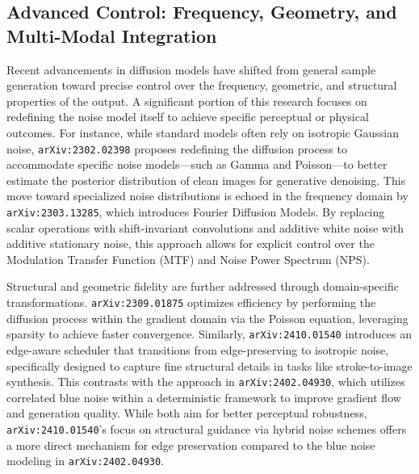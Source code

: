 \documentclass[11pt]{article}
\begin{document}
\subsection{Advanced Control: Frequency, Geometry, and Multi-Modal Integration}

Recent advancements in diffusion models have shifted from general sample generation toward precise control over the frequency, geometric, and structural properties of the output. A significant portion of this research focuses on redefining the noise model itself to achieve specific perceptual or physical outcomes. For instance, while standard models often rely on isotropic Gaussian noise, \texttt{arXiv:2302.02398} proposes redefining the diffusion process to accommodate specific noise models—such as Gamma and Poisson—to better estimate the posterior distribution of clean images for generative denoising. This move toward specialized noise distributions is echoed in the frequency domain by \texttt{arXiv:2303.13285}, which introduces Fourier Diffusion Models. By replacing scalar operations with shift-invariant convolutions and additive white noise with additive stationary noise, this approach allows for explicit control over the Modulation Transfer Function (MTF) and Noise Power Spectrum (NPS).

Structural and geometric fidelity are further addressed through domain-specific transformations. \texttt{arXiv:2309.01875} optimizes efficiency by performing the diffusion process within the gradient domain via the Poisson equation, leveraging sparsity to achieve faster convergence. Similarly, \texttt{arXiv:2410.01540} introduces an edge-aware scheduler that transitions from edge-preserving to isotropic noise, specifically designed to capture fine structural details in tasks like stroke-to-image synthesis. This contrasts with the approach in \texttt{arXiv:2402.04930}, which utilizes correlated blue noise within a deterministic framework to improve gradient flow and generation quality. While both aim for better perceptual robustness, \texttt{arXiv:2410.01540}'s focus on structural guidance via hybrid noise schemes offers a more direct mechanism for edge preservation compared to the blue noise modeling in \texttt{arXiv:2402.04930}.
\end{document}

